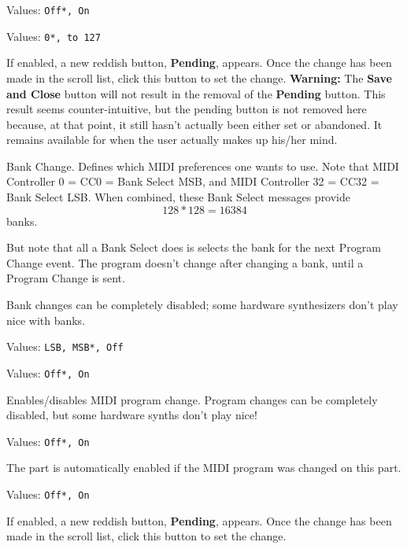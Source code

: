    Values: \texttt{Off*, On}


   Values: \texttt{0*, to 127}

   If enabled, a new reddish button, \textbf{Pending}, appears.
   Once the change has been made in the scroll list, click this button
   to set the change.
   \textbf{Warning:}
   The \textbf{Save and Close} button will not result in the removal of the
   \textbf{Pending} button.
   This result seems counter-intuitive, but the pending button is not removed
   here because, at that point, it still hasn't actually been either set or
   abandoned. It remains available for when the user actually makes up his/her
   mind.

   Bank Change.
   Defines which MIDI preferences one wants to use.
   Note that MIDI Controller 0 = CC0 = Bank Select MSB, and MIDI Controller
   32 = CC32 = Bank Select LSB.
   When combined, these Bank Select messages provide \[128*128 = 16384\]
   banks.

   But note that all a Bank Select does is selects the bank for the next
   Program Change event.  The program doesn't change after changing a bank,
   until a Program Change is sent.

   Bank changes can be completely disabled; some hardware
   synthesizers don't play nice with banks.

   Values: \texttt{LSB, MSB*, Off}


   Values: \texttt{Off*, On}

   Enables/disables MIDI program change.
   Program changes can be completely disabled, but some hardware synths don't
   play nice!


   Values: \texttt{Off*, On}

   The part is automatically enabled if the MIDI program was changed on this
   part.


   Values: \texttt{Off*, On}

   If enabled, a new reddish button, \textbf{Pending}, appears.
   Once the change has been made in the scroll list, click this button
   to set the change.

